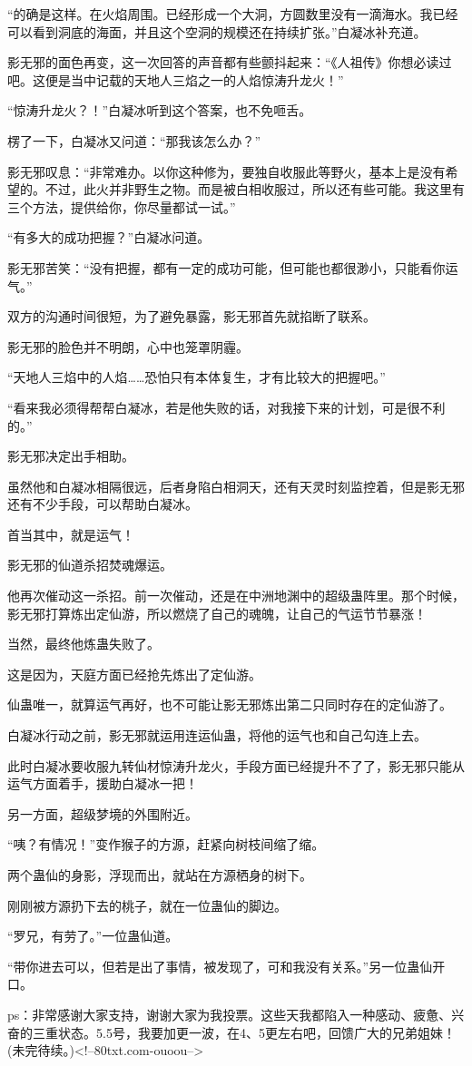 \begin{this_body}
“的确是这样。在火焰周围。已经形成一个大洞，方圆数里没有一滴海水。我已经可以看到洞底的海面，并且这个空洞的规模还在持续扩张。”白凝冰补充道。

影无邪的面色再变，这一次回答的声音都有些颤抖起来：“《人祖传》你想必读过吧。这便是当中记载的天地人三焰之一的人焰惊涛升龙火！”

“惊涛升龙火？！”白凝冰听到这个答案，也不免咂舌。

楞了一下，白凝冰又问道：“那我该怎么办？”

影无邪叹息：“非常难办。以你这种修为，要独自收服此等野火，基本上是没有希望的。不过，此火并非野生之物。而是被白相收服过，所以还有些可能。我这里有三个方法，提供给你，你尽量都试一试。”

“有多大的成功把握？”白凝冰问道。

影无邪苦笑：“没有把握，都有一定的成功可能，但可能也都很渺小，只能看你运气。”

双方的沟通时间很短，为了避免暴露，影无邪首先就掐断了联系。

影无邪的脸色并不明朗，心中也笼罩阴霾。

“天地人三焰中的人焰……恐怕只有本体复生，才有比较大的把握吧。”

“看来我必须得帮帮白凝冰，若是他失败的话，对我接下来的计划，可是很不利的。”

影无邪决定出手相助。

虽然他和白凝冰相隔很远，后者身陷白相洞天，还有天灵时刻监控着，但是影无邪还有不少手段，可以帮助白凝冰。

首当其中，就是运气！

影无邪的仙道杀招焚魂爆运。

他再次催动这一杀招。前一次催动，还是在中洲地渊中的超级蛊阵里。那个时候，影无邪打算炼出定仙游，所以燃烧了自己的魂魄，让自己的气运节节暴涨！

当然，最终他炼蛊失败了。

这是因为，天庭方面已经抢先炼出了定仙游。

仙蛊唯一，就算运气再好，也不可能让影无邪炼出第二只同时存在的定仙游了。

白凝冰行动之前，影无邪就运用连运仙蛊，将他的运气也和自己勾连上去。

此时白凝冰要收服九转仙材惊涛升龙火，手段方面已经提升不了了，影无邪只能从运气方面着手，援助白凝冰一把！

另一方面，超级梦境的外围附近。

“咦？有情况！”变作猴子的方源，赶紧向树枝间缩了缩。

两个蛊仙的身影，浮现而出，就站在方源栖身的树下。

刚刚被方源扔下去的桃子，就在一位蛊仙的脚边。

“罗兄，有劳了。”一位蛊仙道。

“带你进去可以，但若是出了事情，被发现了，可和我没有关系。”另一位蛊仙开口。

ps：非常感谢大家支持，谢谢大家为我投票。这些天我都陷入一种感动、疲惫、兴奋的三重状态。5.5号，我要加更一波，在4、5更左右吧，回馈广大的兄弟姐妹！(未完待续。)<!--80txt.com-ouoou-->

\end{this_body}

